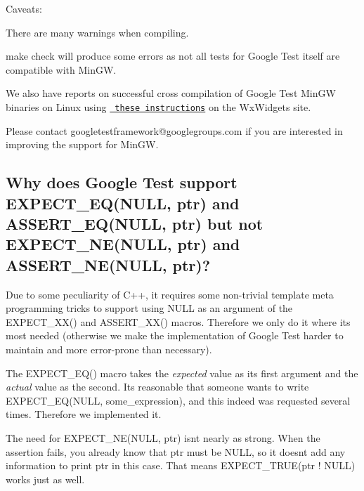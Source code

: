 Caveats\+:


\begin{DoxyItemize}
\item There are many warnings when compiling.
\item {\ttfamily make check} will produce some errors as not all tests for Google Test itself are compatible with Min\+GW.
\end{DoxyItemize}

We also have reports on successful cross compilation of Google Test Min\+GW binaries on Linux using \href{http://wiki.wxwidgets.org/Cross-Compiling_Under_Linux#Cross-compiling_under_Linux_for_MS_Windows}\texttt{ these instructions} on the Wx\+Widgets site.

Please contact {\ttfamily googletestframework@googlegroups.\+com} if you are interested in improving the support for Min\+GW.

\subsection*{Why does Google Test support E\+X\+P\+E\+C\+T\+\_\+\+E\+Q(\+N\+U\+L\+L, ptr) and A\+S\+S\+E\+R\+T\+\_\+\+E\+Q(\+N\+U\+L\+L, ptr) but not E\+X\+P\+E\+C\+T\+\_\+\+N\+E(\+N\+U\+L\+L, ptr) and A\+S\+S\+E\+R\+T\+\_\+\+N\+E(\+N\+U\+L\+L, ptr)?}

Due to some peculiarity of C++, it requires some non-\/trivial template meta programming tricks to support using {\ttfamily N\+U\+LL} as an argument of the {\ttfamily E\+X\+P\+E\+C\+T\+\_\+\+X\+X()} and {\ttfamily A\+S\+S\+E\+R\+T\+\_\+\+X\+X()} macros. Therefore we only do it where it\textquotesingle{}s most needed (otherwise we make the implementation of Google Test harder to maintain and more error-\/prone than necessary).

The {\ttfamily E\+X\+P\+E\+C\+T\+\_\+\+E\+Q()} macro takes the {\itshape expected} value as its first argument and the {\itshape actual} value as the second. It\textquotesingle{}s reasonable that someone wants to write {\ttfamily E\+X\+P\+E\+C\+T\+\_\+\+E\+Q(\+N\+U\+L\+L, some\+\_\+expression)}, and this indeed was requested several times. Therefore we implemented it.

The need for {\ttfamily E\+X\+P\+E\+C\+T\+\_\+\+N\+E(\+N\+U\+L\+L, ptr)} isn\textquotesingle{}t nearly as strong. When the assertion fails, you already know that {\ttfamily ptr} must be {\ttfamily N\+U\+LL}, so it doesn\textquotesingle{}t add any information to print ptr in this case. That means {\ttfamily E\+X\+P\+E\+C\+T\+\_\+\+T\+R\+UE(ptr ! N\+U\+LL)} works just as well.

